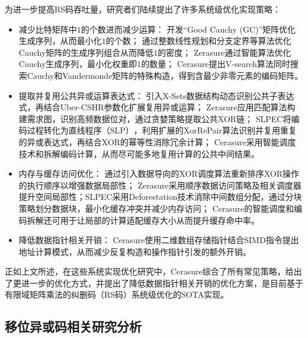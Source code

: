 为进一步提高RS码吞吐量，研究者们陆续提出了许多系统级优化实现策略：

\begin{itemize}
    \item 减少比特矩阵中$1$的个数进而减少运算：
    开发“Good Cauchy (GC)”矩阵优化生成序列，从而最小化$1$的个数；
    通过整数线性规划和分支定界等算法优化Cauchy矩阵的生成序列组合从而降低$1$的密度；
    Zerasure\cite{zhouFastErasureCoding2020}通过智能算法优化Cauchy生成序列，最小化权重即1的数量；
    Cerasure\cite{wangFastAccelerationStrategies2025}提出V-search算法同时搜索Cauchy和Vandermonde矩阵的特殊构造，得到含最少非零元素的编码矩阵。
    \item 提取并复用公共异或运算表达式：
    引入X-Sets数据结构动态识别公共子表达式，再结合Uber-CSHR参数化扩展复用异或运算；
    Zerasure\cite{zhouFastErasureCoding2020}应用匹配算法构建需求图，识别高频数据位对，通过贪婪策略提取公共XOR链；
    SLPEC\cite{uezatoAcceleratingXORbasedErasure2021}将编码过程转化为直线程序（SLP）​​，利用扩展的​​XorRePair算法识别并复用重复的异或表达式，再结合XOR的幂等性消除冗余计算；
    Cerasure\cite{wangFastAccelerationStrategies2025}采用智能调度技术和拆解编码计算，从而尽可能多地复用计算的公共中间结果。
    \item 内存与缓存访问优化：
    通过引入数据导向的XOR调度算法重新排序XOR操作的执行顺序以增强数据局部性；
    Zerasure\cite{zhouFastErasureCoding2020}采用顺序数据访问策略及相关调度器提升空间局部性；SLPEC\cite{uezatoAcceleratingXORbasedErasure2021}采用​​Deforestation技术​​消除中间数组分配，通过分块策略​​划分数据块，最小化缓存冲突并减少内存访问；
    Cerasure\cite{wangFastAccelerationStrategies2025}的智能调度和编码拆解还可用于让局部的计算适配缓存大小从而提升缓存命中率。
    \item 降低数据指针相关开销：
    Cerasure\cite{wangFastAccelerationStrategies2025}使用 ​​二维数组存储指针结合SIMD指令提出地址计算模式，从而减少反复构造和操作指针引发的额外开销。
\end{itemize}

正如上文所述，在这些系统实现优化研究中，Cerasure综合了所有常见策略，给出了更进一步的优化方式，并提出了降低数据指针相关开销的优化方案，是目前基于有限域矩阵乘法的纠删码（RS码）系统级优化的SOTA实现。

\subsection{移位异或码相关研究分析}

